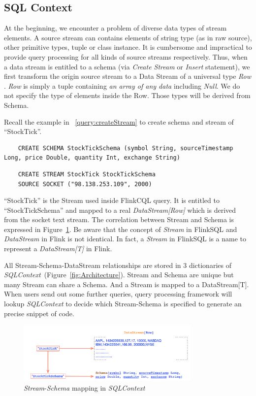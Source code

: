 \subsection{SQL Context} 

At the beginning, we encounter a problem of diverse data types of stream elements. A source stream can contains elements of string type (as in raw source), other primitive types, tuple or class instance. It is cumbersome and impractical to provide query processing for all kinds of source streams respectively. Thus, when a data stream is entitled to a schema (via \textit{Create Stream} or \textit{Insert} statement), we first transform the origin source stream to a Data Stream of a universal type \textit{Row} . \textit{Row} is simply a tuple containing \textit{an array of any data} including \textit{Null}. We do not specify the type of elements inside the Row. Those types will be derived from Schema.

Recall the example in ~\ref{query:createStream} to create schema and stream of ``StockTick''.
\begin{lstlisting}
	CREATE SCHEMA StockTickSchema (symbol String, sourceTimestamp Long, price Double, quantity Int, exchange String)
\end{lstlisting}

\begin{lstlisting} 
	CREATE STREAM StockTick StockTickSchema 
	SOURCE SOCKET ("98.138.253.109", 2000)
\end{lstlisting}

``StockTick'' is the Stream used inside FlinkCQL query. It is entitled to ``StockTickSchema'' and mapped to a real \textit{DataStream[Row]} which is derived from the socket text stream. The correlation between Stream and Schema is expressed in Figure~\ref{fig:SQLContext}. Be aware that the concept of \textit{Stream} in FlinkSQL and \textit{DataStream} in Flink is not identical. In fact, a \textit{Stream} in FlinkSQL is a name to represent a \textit{DataStream[T]} in Flink.

All Stream-Schema-DataStream relationships are stored in 3 dictionaries of \textit{SQLContext}~(Figure~\ref{fig:Architecture}). 
Stream and Schema are unique but many Stream can share a Schema. And a Stream is mapped to a DataStream[T]. When users send out some further queries, query processing framework will lookup \textit{SQLContext} to decide which Stream-Schema is specified to generate an precise snippet of code.

\begin{figure}[h!] 
\centering    
\includegraphics[width=0.8\textwidth]{SQLContext}
\caption{\textit{Stream}-\textit{Schema} mapping in \textit{SQLContext}}
\label{fig:SQLContext}
\end{figure}


